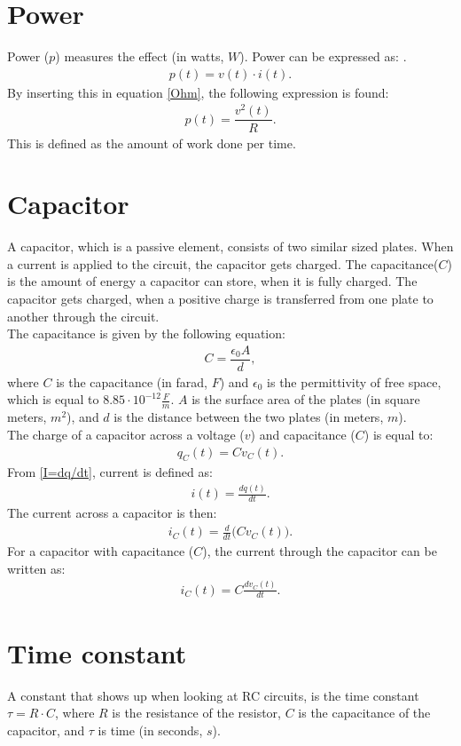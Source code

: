 \section{Power} 
Power ($p$) measures the effect (in watts, $W$). Power can be expressed as: \cite[p. 22]{bcircuit5}.
\begin{align} 
\label{power}
p(t)=v(t)\cdot i(t).
\end{align}
By inserting this in equation \eqref{Ohm}, the following expression is found:
\begin{align}
p(t)=\dfrac{v^2(t)}{R}. \label{resistor:power}
\end{align}
This is defined as the amount of work done per time. 
\section{Capacitor}
A capacitor, which is a passive element, consists of two similar sized plates. When a current is applied to the circuit, the capacitor gets charged. The capacitance($C$) is the amount of energy a capacitor can store, when it is fully charged. The capacitor gets charged, when a positive charge is transferred from one plate to another through the circuit.
\\
The capacitance is given by the following equation:
\begin{align*}
C=\dfrac{\epsilon_{0}A}{d},
\end{align*}
where $C$ is the capacitance (in farad, $F$) and $\epsilon_{0}$ is the permittivity of free space, which is equal to $8.85 \cdot 10^{-12}                                                 \frac{F}{m}$. $A$ is the surface area of the plates (in square meters, $m^{2}$), and $d$ is the distance between the two plates (in meters, $m$).
\\
The charge of a capacitor across a voltage ($v$) and capacitance ($C$) is equal to: \cite[p.~253]{bcircuit5}
\begin{align}
\label{QCV}
q_C(t) = Cv_C(t).	
\end{align}
From \eqref{I=dq/dt}, current is defined as:
\begin{align*}
	i(t) = \frac{dq(t)}{dt}.
\end{align*}
The current across a capacitor is then:
\begin{align*}
	i_C(t) = \frac{d}{dt}\big(Cv_C(t)\big).
\end{align*}
For a capacitor with capacitance ($C$), the current through the capacitor can be written as:
\begin{align}
	i_C(t) = C\frac{dv_C(t)}{dt}.\label{iC}
\end{align}
\section{Time constant}
A constant that shows up when looking at RC circuits, is the time constant $\tau = R \cdot C$, where $R$ is the resistance of the resistor, $C$ is the capacitance of the capacitor, and $\tau$ is time (in seconds, $s$).

